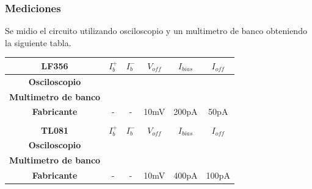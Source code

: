 \documentclass[a4paper]{article}
\begin{document}
\subsubsection{Mediciones}
Se midio el circuito utilizando osciloscopio y un multimetro de banco  obteniendo la siguiente tabla.
\begin{table}[H]
\begin{tabular}{cccccc}
\hline
\multicolumn{1}{|c|}{\textbf{LF356}}               & \multicolumn{1}{c|}{\textbf{$I_b^+$}} & \multicolumn{1}{c|}{\textbf{$I_b^-$}} & \multicolumn{1}{c|}{\textbf{$V_{off}$}} & \multicolumn{1}{c|}{\textbf{$I_{bias}$}} & \multicolumn{1}{c|}{\textbf{$I_{off}$}} \\ \hline
\multicolumn{1}{|c|}{\textbf{Osciloscopio}}        & \multicolumn{1}{c|}{}                 & \multicolumn{1}{c|}{}                 & \multicolumn{1}{c|}{}                   & \multicolumn{1}{c|}{}                    & \multicolumn{1}{c|}{}                   \\ \hline
\multicolumn{1}{|c|}{\textbf{Multimetro de banco}} & \multicolumn{1}{c|}{}                 & \multicolumn{1}{c|}{}                 & \multicolumn{1}{c|}{}                   & \multicolumn{1}{c|}{}                    & \multicolumn{1}{c|}{}                   \\ \hline
\multicolumn{1}{|c|}{\textbf{Fabricante}}          & \multicolumn{1}{c|}{-}                & \multicolumn{1}{c|}{-}                & \multicolumn{1}{c|}{10mV}               & \multicolumn{1}{c|}{200pA}               & \multicolumn{1}{c|}{50pA}               \\ \hline
\textbf{}                                          & \textbf{}                             & \textbf{}                             & \textbf{}                               & \textbf{}                                & \textbf{}                               \\ \hline
\multicolumn{1}{|c|}{\textbf{TL081}}               & \multicolumn{1}{c|}{\textbf{$I_b^+$}} & \multicolumn{1}{c|}{\textbf{$I_b^-$}} & \multicolumn{1}{c|}{\textbf{$V_{off}$}} & \multicolumn{1}{c|}{\textbf{$I_{bias}$}} & \multicolumn{1}{c|}{\textbf{$I_{off}$}} \\ \hline
\multicolumn{1}{|c|}{\textbf{Osciloscopio}}        & \multicolumn{1}{c|}{}                 & \multicolumn{1}{c|}{}                 & \multicolumn{1}{c|}{}                   & \multicolumn{1}{c|}{}                    & \multicolumn{1}{c|}{}                   \\ \hline
\multicolumn{1}{|c|}{\textbf{Multimetro de banco}} & \multicolumn{1}{c|}{}                 & \multicolumn{1}{c|}{}                 & \multicolumn{1}{c|}{}                   & \multicolumn{1}{c|}{}                    & \multicolumn{1}{c|}{}                   \\ \hline
\multicolumn{1}{|c|}{\textbf{Fabricante}}          & \multicolumn{1}{c|}{-}                & \multicolumn{1}{c|}{-}                & \multicolumn{1}{c|}{10mV}               & \multicolumn{1}{c|}{400pA}               & \multicolumn{1}{c|}{100pA}              \\ \hline
\end{tabular}
\end{table}
\end{document}
